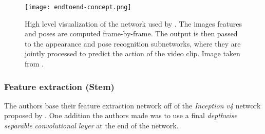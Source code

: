 \begin{figure}[htb!]
    \centering
    \texttt{[image: endtoend-concept.png]}
    \caption{High level visualization of the network used by \cite{luvizon_2d/3d_2018}. The images features and poses are computed frame-by-frame. The output is then passed to the appearance and pose recognition subnetworks, where they are jointly processed to predict the action of the video clip. Image taken from \cite{luvizon_2d/3d_2018}.}
    \label{fig:luvizon_overview}
\end{figure}

\subsubsection{Feature extraction (Stem)}
The authors base their feature extraction network off of the \textit{Inception v4} network proposed by \cite{szegedy_inception-v4_2017}.
One addition the authors made was to use a final \textit{depthwise separable convolutional layer} at the end of the network.


